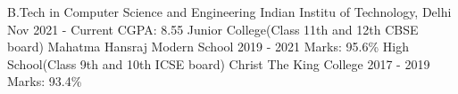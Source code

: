 

\begin{cventries}

  \cventry
    {B.Tech in Computer Science and Engineering} %
    {Indian Institu of Technology, Delhi} %
    {Nov 2021 - Current} %
    {CGPA: 8.55} %
    {}
    \vspace{-2mm}
\cventry
    {Junior College(Class 11th and 12th CBSE board)} %
    {Mahatma Hansraj Modern School} %
    {2019 - 2021} %
    {Marks: 95.6\%} %
    {}
    \vspace{-2mm}
    \cventry
    {High School(Class 9th and 10th ICSE board)} %
    {Christ The King College} %
    {2017 - 2019} %
    {Marks: 93.4\%} %
{}
\vspace{-2mm}
\end{cventries}
